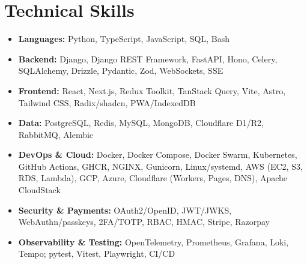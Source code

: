 \documentclass[11pt,a4paper]{article}
\begin{document}
\section{Technical Skills}
\begin{itemize}
  \item \textbf{Languages:} Python, TypeScript, JavaScript, SQL, Bash
  \item \textbf{Backend:} Django, Django REST Framework, FastAPI, Hono, Celery, SQLAlchemy, Drizzle, Pydantic, Zod, WebSockets, SSE
  \item \textbf{Frontend:} React, Next.js, Redux Toolkit, TanStack Query, Vite, Astro, Tailwind CSS, Radix/shadcn, PWA/IndexedDB
  \item \textbf{Data:} PostgreSQL, Redis, MySQL, MongoDB, Cloudflare D1/R2, RabbitMQ, Alembic
  \item \textbf{DevOps \& Cloud:} Docker, Docker Compose, Docker Swarm, Kubernetes, GitHub Actions, GHCR, NGINX, Gunicorn, Linux/systemd, AWS (EC2, S3, RDS, Lambda), GCP, Azure, Cloudflare (Workers, Pages, DNS), Apache CloudStack
  \item \textbf{Security \& Payments:} OAuth2/OpenID, JWT/JWKS, WebAuthn/passkeys, 2FA/TOTP, RBAC, HMAC, Stripe, Razorpay
  \item \textbf{Observability \& Testing:} OpenTelemetry, Prometheus, Grafana, Loki, Tempo; pytest, Vitest, Playwright, CI/CD
\end{itemize}
\end{document}
